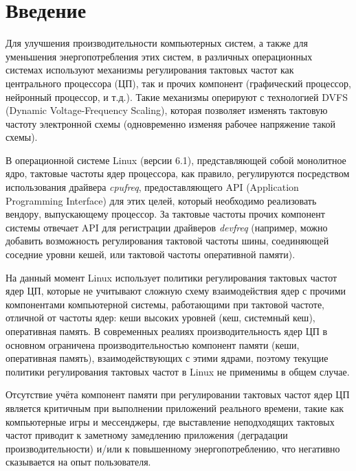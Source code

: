 \section{Введение}
\label{sec:Section0} 

    Для улучшения производительности компьютерных систем, а также для уменьшения энергопотребления
    этих систем, в различных операционных системах
    используют механизмы регулирования тактовых частот как центрального процессора (ЦП),
    так и прочих компонент (графический процессор, нейронный процессор, и т.д.). Такие механизмы
    оперируют с технологией DVFS (Dynamic Voltage-Frequency Scaling), которая позволяет изменять
    тактовую частоту электронной схемы (одновременно изменяя рабочее напряжение такой схемы).

    В операционной системе Linux (версии 6.1), представляющей собой монолитное ядро,
    тактовые частоты ядер процессора, как правило, регулируются посредством использования драйвера
    \textit{cpufreq}, предоставляющего API (Application Programming Interface) для этих целей, который
    необходимо реализовать вендору, выпускающему процессор. За тактовые частоты прочих компонент системы
    отвечает API для регистрации драйверов \textit{devfreq} (например, можно добавить возможность
    регулирования тактовой частоты шины,
    соединяющей соседние уровни кешей, или тактовой частоты оперативной памяти).

    На данный момент Linux использует политики регулирования тактовых частот ядер ЦП, которые
    не учитывают сложную схему взаимодействия ядер с прочими компонентами компьютерной системы,
    работающими при тактовой частоте, отличной от частоты ядер: кеши высоких уровней (кеш, системный кеш),
    оперативная память. В современных реалиях производительность ядер ЦП в основном ограничена
    производительностью компонент памяти (кеши, оперативная память), взаимодействующих с этими ядрами,
    поэтому текущие политики регулирования тактовых частот в Linux не применимы в общем случае.

    Отсутствие учёта компонент памяти при регулировании тактовых частот ядер ЦП является
    критичным при выполнении приложений реального времени, такие как компьютерные игры и мессенджеры, где
    выставление неподходящих тактовых частот приводит к заметному замедлению приложения (деградации
    производительности) и/или к повышенному энергопотреблению, что негативно сказывается на
    опыт пользователя.

